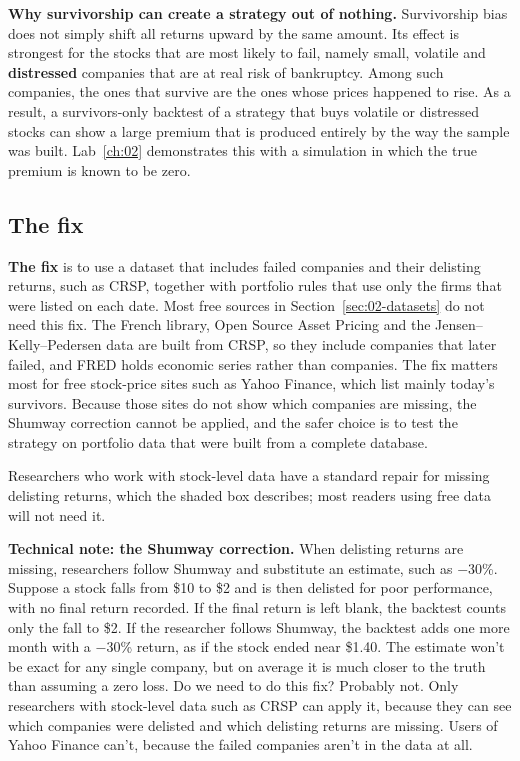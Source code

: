 \textbf{Why survivorship can create a strategy out of nothing.} Survivorship bias does not simply shift all returns upward by the same amount. Its effect is strongest for the stocks that are most likely to fail, namely small, volatile and \textbf{distressed} companies that are at real risk of bankruptcy. Among such companies, the ones that survive are the ones whose prices happened to rise. As a result, a survivors-only backtest of a strategy that buys volatile or distressed stocks can show a large premium that is produced entirely by the way the sample was built. Lab~\ref{ch:02} demonstrates this with a simulation in which the true premium is known to be zero.

\subsection{The fix}

\textbf{The fix} is to use a dataset that includes failed companies and their delisting returns, such as CRSP, together with portfolio rules that use only the firms that were listed on each date. 
Most free sources in Section~\ref{sec:02-datasets} do not need this fix. The French library, Open Source Asset Pricing and the Jensen--Kelly--Pedersen data are built from CRSP, so they include companies that later failed, and FRED holds economic series rather than companies. The fix matters most for free stock-price sites such as Yahoo Finance, which list mainly today's survivors. Because those sites do not show which companies are missing, the Shumway correction cannot be applied, and the safer choice is to test the strategy on portfolio data that were built from a complete database.

Researchers who work with stock-level data have a standard repair for missing delisting returns, which the shaded box describes; most readers using free data will not need it.

\begin{technote}
\textbf{Technical note: the Shumway correction.} When delisting returns are missing, researchers follow Shumway and substitute an estimate, such as $-30$\%.
Suppose a stock falls from \$10 to \$2 and is then delisted for poor performance, with no final return recorded.
If the final return is left blank, the backtest counts only the fall to \$2.
If the researcher follows Shumway, the backtest adds one more month with a $-30$\% return, as if the stock ended near \$1.40.
The estimate won’t be exact for any single company, but on average it is much closer to the truth than assuming a zero loss.
Do we need to do this fix? Probably not. Only researchers with stock-level data such as CRSP can apply it, because they can see which companies were delisted and which delisting returns are missing. Users of Yahoo Finance can’t, because the failed companies aren’t in the data at all.
\end{technote}

